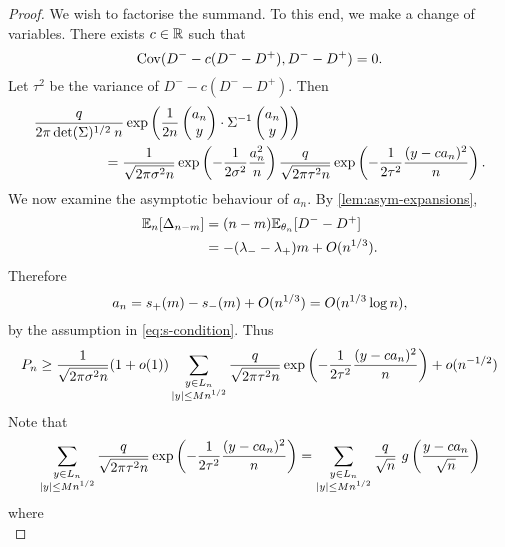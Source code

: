 \begin{proof}
    We wish to factorise the summand. To this end, we make a change of variables. There exists $c \in {\mathbb R}$ such that
    \begin{equation*}
        \operatorname{Cov}(D^- - c(D^- - D^+), D^- - D^+) = 0.
    \end{equation*}
    Let $\tau^2$ be the variance of $D^- - c(D^- - D^+)$. Then
    \begin{align*}
         &\frac{q}{2\pi \det(\Sigma)^{1/2} \: n} \exp\left( 
            \frac{1}{2n} \begin{pmatrix} a_n \\ y \end{pmatrix} \cdot \Sigma^{-1} \begin{pmatrix} a_n \\ y \end{pmatrix}
         \right) \nonumber \\
         & \hspace{5em} =
         \frac{1}{\sqrt{2 \pi \sigma^2 n}} \exp \left( - \frac{1}{2 \sigma^2} \frac{a_n^2}{n} \right)
         \frac{q}{\sqrt{2 \pi \tau^2 n}} \exp \left( - \frac{1}{2 \tau^2} \frac{(y - ca_n)^2}{n} \right).
    \end{align*}
    We now examine the asymptotic behaviour of $a_n$. By \cref{lem:asym-expansions},
    \begin{align*}
        {\mathbb E}_n[\Delta_{n-m}]
        &= (n - m) {\mathbb E}_{\theta_n}[D^- - D^+] \\ 
        &= -(\lambda_- - \lambda_+)m + O(n^{1/3}).
    \end{align*}
    Therefore 
    \begin{equation*}
        a_n = s_+(m) - s_-(m) + O(n^{1/3}) = O(n^{1/3} \log n),
    \end{equation*}
    by the assumption in \cref{eq:s-condition}. Thus
    \begin{equation*}
        P_n \geq
        \frac{1}{\sqrt{2 \pi \sigma^2 n}}(1 + o(1))
        \sum_{\substack{y \in L_n \\ \lvert y\rvert \leq M n^{1/2}}}
        \frac{q}{\sqrt{2 \pi \tau^2 n}} \exp \left( - \frac{1}{2 \tau^2} \frac{(y - ca_n)^2}{n} \right)
        + o(n^{-1/2})
    \end{equation*}
    Note that
    \begin{equation*}
        \sum_{\substack{y \in L_n \\ \lvert y\rvert \leq M n^{1/2}}}
        \frac{q}{\sqrt{2 \pi \tau^2 n}} \exp \left( - \frac{1}{2 \tau^2} \frac{(y - ca_n)^2}{n} \right)
        = \sum_{\substack{y \in L_n \\ \lvert y\rvert \leq M n^{1/2}}}
        \frac{q}{\sqrt{n}}\ g\left( \frac{y - ca_n}{\sqrt{n}} \right)
    \end{equation*}
    where
    \begin{equation*}

\end{equation*}
\end{proof}
